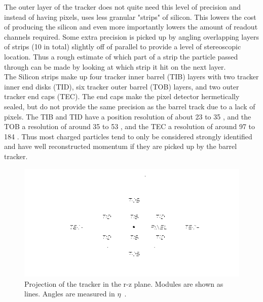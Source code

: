 	The outer layer of the tracker does not quite need this level of precision and instead of having pixels, uses less granular "strips" of silicon. This lowers the cost of producing the silicon and even more importantly lowers the amount of readout channels required. Some extra precision is picked up by angling overlapping layers of strips (10 in total) slightly off of parallel to provide a level of stereoscopic location. Thus a rough estimate of which part of a strip the particle passed through can be made by looking at which strip it hit on the next layer.\\
	
	The Silicon strips make up four tracker inner barrel (TIB) layers with two tracker inner end disks (TID), six tracker outer barrel (TOB) layers, and two outer tracker end caps (TEC). The end caps make the pixel detector hermetically sealed, but do not provide the same precision as the barrel track due to a lack of pixels. The TIB and TID have a position resolution of about 23 to 35 \um, and the TOB a resolution of around 35 to 53 \um, and the TEC a resolution of around 97 to 184 \um. Thus most charged particles tend to only be considered strongly identified and have well reconstructed momentum if they are picked up by the barrel tracker.\\
	
						\begin{figure}[h]
\begin{center}
\includegraphics[width=0.9\linewidth]{Figs/tracker_layout.png}
\caption{\label{fig:tracker}
Projection of the tracker in the r-z plane. Modules are shown as lines. Angles are measured in $\eta$~\cite{trackingperformance}.
}
\end{center}
\end{figure}
	
